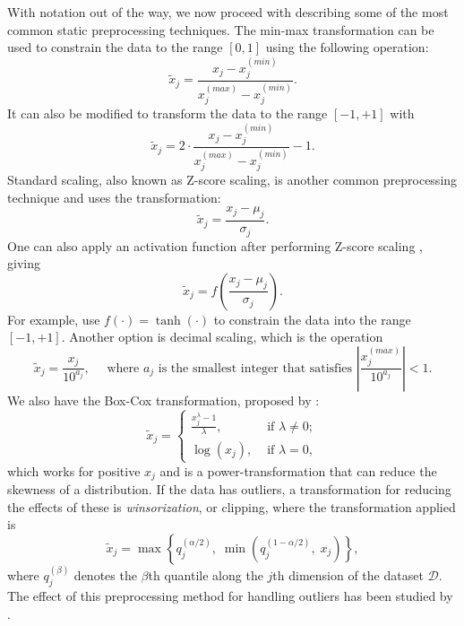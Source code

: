 \documentclass{statsmsc}
\begin{document}
{With notation out of the way, we now proceed with describing some of the most common
static preprocessing techniques.  The min-max transformation can be
used to constrain the data to the range $[0, 1]$ using the following operation:
\begin{equation}\label{eq:pp1}
    \tilde{x}_j = \frac{x_j-x_j^{(min)}}{x_j^{(max)}-x_j^{(min)}} .
\end{equation}
It can also be modified to transform the data to the range $[-1,+1]$ with
\begin{equation}\label{eq:pp2}
    \tilde{x}_j = 2\cdot\frac{x_j-x_j^{(min)}}{x_j^{(max)}-x_j^{(min)}}-1.
\end{equation}
Standard scaling, also known as Z-score scaling, is another common preprocessing technique and
uses the transformation:
\begin{equation}\label{eq:pp3}
    \tilde{x}_j=\frac{x_j-\mu_j}{\sigma_j}.
\end{equation}
One can also apply an activation function after performing Z-score scaling \citep{nawi},
giving
\begin{equation}\label{eq:pp4}
    \tilde{x}_j=f\left(\frac{x_j-\mu_j}{\sigma_j}\right).
\end{equation}
For example, \cite{mixture_ct} use $f(\cdot)=\tanh(\cdot)$ to constrain the data into 
the range $[-1,+1]$.
Another option is decimal scaling, which is the operation
\begin{equation}\label{eq:pp5}
    \tilde{x}_j=\frac{x_j}{10^{a_j}}, \quad \textrm{ where } a_j
    \textrm{ is the smallest integer that satisfies }
        \left|\frac{x_j^{(max)}}{10^{a_j}}  \right|<1.
\end{equation}
We also have the Box-Cox transformation, proposed by \cite{boxcox}:
\begin{equation}\label{eq:pp6}
    \tilde{x}_j=\left\{
        \begin{array}{ll}
            \frac{x_j^\lambda-1}{\lambda}, & \textrm{ if } \lambda \neq 0; \\
            \log(x_j), & \textrm{ if } \lambda=0,
        \end{array}
    \right.
\end{equation}
which works for positive $x_j$ and is a power-transformation that can reduce the skewness of
a distribution.  If the data has outliers, a transformation for reducing the effects of these
is \textit{winsorization}, or clipping,
where the transformation applied is
\begin{equation}\label{eq:pp7}
    \tilde{x}_j=\max\left\{q_j^{(\alpha/2)},\;\min\left(q_j^{(1-\alpha/2)},\; x_j\right)\right\},
\end{equation}
where $q_j^{(\beta)}$ denotes the $\beta$th quantile along the $j$th dimension of the dataset
$\mathcal{D}$. The effect of this preprocessing method for handling outliers has been
studied by \cite{winsorization}.

}
\end{document}
